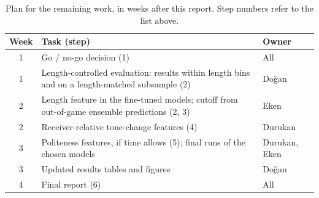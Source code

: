 \documentclass[conference]{IEEEtran}
\begin{document}
\begin{table}[t]
\centering
\caption{Plan for the remaining work, in weeks after this report. Step numbers refer to the list above.}
\label{tab:plan}
\setlength{\tabcolsep}{3pt}
\renewcommand{\arraystretch}{1.15}
\begin{tabular}{c>{\raggedright\arraybackslash}p{4.6cm}>{\raggedright\arraybackslash}p{1.75cm}}
\toprule
Week & Task (step) & Owner \\
\midrule
1 & Go / no-go decision (1) & All \\
1 & Length-controlled evaluation: results within length bins and on a length-matched subsample (2) & Do\u{g}an \\
\midrule
2 & Length feature in the fine-tuned models; cutoff from out-of-game ensemble predictions (2, 3) & Eken \\
2 & Receiver-relative tone-change features (4) & Durukan \\
\midrule
3 & Politeness features, if time allows (5); final runs of the chosen models & Durukan, Eken \\
3 & Updated results tables and figures & Do\u{g}an \\
\midrule
4 & Final report (6) & All \\
\bottomrule
\end{tabular}
\end{table}



\end{document}
